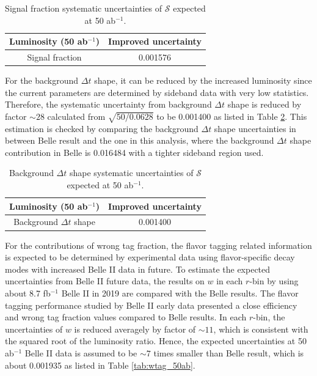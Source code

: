 \begin{table}[htpb]
	\centering
	\caption{ Signal fraction systematic uncertainties of $\mathcal{S}$ expected at 50 ab$^{-1}$.}
	\label{tab:sig_f}
	\begin{tabular}{c| c}
		\hline
		Luminosity (50 ab$^{-1}$) & Improved uncertainty \\
		\hline
		Signal fraction &  0.001576 \\
		\hline
	\end{tabular}
\end{table}

For the background $\Delta t$ shape, it can be reduced by the increased luminosity since the current parameters are determined by sideband data with very low statistics. Therefore, the systematic uncertainty from background $\Delta t$ shape is reduced by factor $\sim 28$ calculated from $\sqrt{50/0.0628}$ to be 0.001400 as listed in Table \ref{tab:bkg_shape}. This estimation is checked by comparing the background $\Delta t$ shape uncertainties in between Belle result and the one in this analysis, where the background $\Delta t$ shape contribution in Belle is 0.016484\cite{kang2020measurement} with a tighter sideband region used. 

\begin{table}[htpb]
	\centering
	\caption{ Background $\Delta t$ shape systematic uncertainties of $\mathcal{S}$ expected at 50 ab$^{-1}$.}
	\label{tab:bkg_shape}
	\begin{tabular}{c| c}
		\hline
		Luminosity (50 ab$^{-1}$) & Improved uncertainty \\
		\hline
		Background $\Delta t$ shape &  0.001400 \\
		\hline
	\end{tabular}
\end{table}

For the contributions of wrong tag fraction, the flavor tagging related information is expected to be determined by experimental data using flavor-specific decay modes with increased Belle II data in future. To estimate the expected uncertainties from Belle II future data, the results on $w$ in each $r$-bin by using about 8.7 fb$^{-1}$ Belle II in 2019 are compared with the Belle results\cite{abudinen2020first}. The flavor tagging performance studied by Belle II early data presented a close efficiency and wrong tag fraction values compared to Belle results. In each $r$-bin, the uncertainties of $w$ is reduced averagely by factor of $\sim 11$, which is consistent with the squared root of the luminosity ratio. Hence, the expected uncertainties at 50 ab$^{-1}$ Belle II data is assumed to be $\sim 7$ times smaller than Belle result\cite{kang2020measurement}, which is about 0.001935 as listed in Table \ref{tab:wtag_50ab}.

